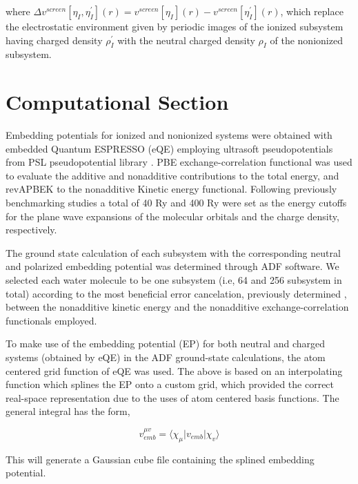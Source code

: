 \documentclass[12pt,a4paper]{article}
\begin{document}
where $\Delta{v}^{screen}[\eta_I, \eta^{'}_I](r) = {v}^{screen}[\eta_I](r) - {v}^{screen}[\eta^{'}_I](r)$, which replace the
electrostatic environment given by periodic images of the ionized subsystem having charged density $\rho^{'}_I$ with the neutral charged
density $\rho_I$ of the nonionized subsystem.

\section{Computational Section}

Embedding potentials for ionized and nonionized systems were obtained with embedded Quantum ESPRESSO (eQE) \cite{genova2017eqe}
employing ultrasoft pseudopotentials from PSL pseudopotential library \cite{corso2014comput}. PBE exchange-correlation functional 
\cite{perdew1996phys} was used to evaluate the additive and nonadditive contributions to the total energy, and revAPBEK
\cite{laricchia2011generalized} to the nonadditive Kinetic energy functional. Following previously benchmarking studies
\cite{genova2016avoiding, genova2017cooperation} a total of 40 Ry and 400 Ry were set as the energy cutoffs for the plane wave 
expansions of the molecular orbitals and the charge density, respectively.  

The ground state calculation of each subsystem with the corresponding neutral and polarized embedding potential was determined through ADF
\cite{te2001chemistry} software. We selected each water molecule to be one subsystem (i.e, 64 and 256 subsystem in total) according to the most beneficial
error cancelation, previously determined
\cite{genova2016avoiding, kevorkyants2013calculating, pavanello2011modelling, ramos2016critical, solovyeva2012spin},
between the nonadditive kinetic energy and the nonadditive exchange-correlation functionals employed.

To make use of the embedding potential (EP) for both neutral and charged systems (obtained by eQE) in the ADF ground-state
calculations, the atom centered grid function of eQE was used. The above is based on an interpolating function which 
splines the EP onto a custom grid, which provided the correct real-space representation due to the uses of atom centered
basis functions. The general integral has the form,

\begin{equation}
	v_{emb}^{\mu v} = \langle \chi_{\mu}|v_{emb}|\chi_{v}\rangle 
\end{equation}

This will generate a Gaussian cube file containing the splined embedding potential\cite{genova2017eqe}.
\end{document}
